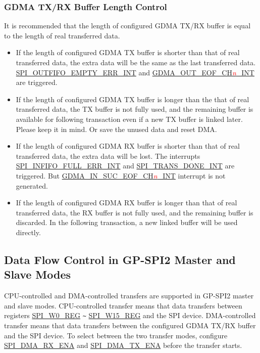 \documentclass[main\_\_EN.tex]{subfiles}
\begin{document}
\subsubsection{GDMA TX/RX Buffer Length Control}\label{sec:spi-dma-tx-rx-buffer-length-ctrl}

It is recommended that the length of configured GDMA TX/RX buffer is equal to the length of real transferred data.

\begin{itemize}
    \item If the length of configured GDMA TX buffer is shorter than that of real transferred data, the extra data will be the same as the last transferred data. \hyperref[int:SPIOUTFIFOEMPTYERRINT]{SPI\_OUTFIFO\_EMPTY\_ERR\_INT} and \hyperref[int:GDMAOUTEOFINT]{GDMA\_OUT\_EOF\_CH\textcolor{red}{\it{n}}\_INT} are triggered.

    \item If the length of configured GDMA TX buffer is longer than the that of real transferred data, the TX buffer is not fully used, and the remaining buffer is available for following transaction even if a new TX buffer is linked later. Please keep it in mind. Or save the unused data and reset DMA.

    \item If the length of configured GDMA RX buffer is shorter than that of real transferred data, the extra data will be lost. The interrupts \hyperref[int:SPIINFIFOFULLERRINT]{SPI\_INFIFO\_FULL\_ERR\_INT} and \hyperref[int:SPITRANSDONEINT]{SPI\_TRANS\_DONE\_INT} are triggered. But \hyperref[int:GDMAINSUCEOFINT]{GDMA\_IN\_SUC\_EOF\_CH\textcolor{red}{\it{n}}\_INT} interrupt is not generated.

    \item If the length of configured GDMA RX buffer is longer than that of real transferred data, the RX buffer is not fully used, and the remaining buffer is discarded. In the following transaction, a new linked buffer will be used directly.

\end{itemize}

\subsection{Data Flow Control in GP-SPI2 Master and Slave Modes}\label{sec:spi-func-descr-data-flow-ctrl-gp-spi2-master-slave}

CPU-controlled and DMA-controlled transfers are supported in GP-SPI2 master and slave modes.
CPU-controlled transfer means that data transfers between registers \hyperref[regdesc:SPIW0REG]{SPI\_W0\_REG} \verb+~+ \hyperref[regdesc:SPIW15REG]{SPI\_W15\_REG} and the SPI device. DMA-controlled transfer means that data transfers between the configured GDMA TX/RX buffer and the SPI device. To select between the two transfer modes, configure \hyperref[fielddesc:SPIDMARXENA]{SPI\_DMA\_RX\_ENA} and \hyperref[fielddesc:SPIDMATXENA]{SPI\_DMA\_TX\_ENA} before the transfer starts.
\end{document}
